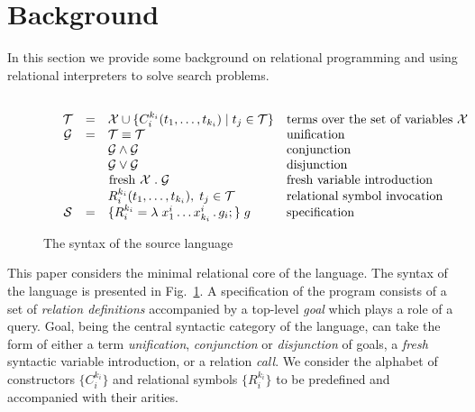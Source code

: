 \section{Background}

In this section we provide some background on relational programming and using relational interpreters to solve search problems.

\subsection{\mk}

\begin{figure*}[t]
  \[
  \begin{array}{cccll}
    &\mathcal{T} & = & \mathcal{X} \cup \{C_i^{k_i} (t_1, \dots, t_{k_i}) \mid t_j\in\mathcal{T}\} & \mbox{terms over the set of variables $\mathcal{X}$} \\
    &\mathcal{G} & = & \mathcal{T}\equiv\mathcal{T}   &  \mbox{unification} \\
    &            &   & \mathcal{G}\wedge\mathcal{G}     & \mbox{conjunction} \\
    &            &   & \mathcal{G}\vee\mathcal{G}       &\mbox{disjunction} \\
    &            &   & \mbox{\lstinline|fresh|}\;\mathcal{X}\;.\;\mathcal{G} & \mbox{fresh variable introduction} \\
    &            &   & R_i^{k_i} (t_1,\dots,t_{k_i}),\;t_j\in\mathcal{T} & \mbox{relational symbol invocation} \\
    &\mathcal{S} & = & \{R_i^{k_i} = \lambda\;x_1^i\dots x_{k_i}^i\,.\, g_i;\}\; g & \mbox{specification}
  \end{array}
  \]
  \caption{The syntax of the source language}
  \label{syntax}
  \end{figure*}



This paper considers the minimal relational core of the \mk language.
The syntax of the language is presented in Fig.~\ref{syntax}.
A specification of the \mk program consists of a set of \emph{relation definitions} accompanied by a top-level \emph{goal} which plays a role of a query.
Goal, being the central syntactic category of the language, can take the form of either a term \emph{unification}, \emph{conjunction} or \emph{disjunction} of goals, a \emph{fresh} syntactic variable introduction, or a relation \emph{call}.
We consider the alphabet of constructors $\{C^{k_i}_i\}$ and relational symbols $\{R^{k_i}_i\}$ to be predefined and accompanied with their arities.

